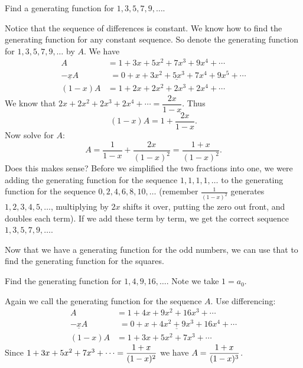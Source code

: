 \documentclass[12pt]{article}
\begin{document}
\begin{example}
 Find a generating function for $1, 3, 5, 7, 9,\ldots$.
 \begin{solution}
  Notice that the sequence of differences is constant. We know how to find the generating function for any constant sequence.  So denote the generating function for $1, 3, 5, 7, 9, \ldots$ by $A$.  We have
  \begin{align*}
   A & = 1 + 3x + 5x^2 + 7x^3 + 9x^4 + \cdots \\
   \underline{-xA} & \underline{\,\,= 0 + x + 3x^2 +  5x^3 + 7x^4 + 9x^5 + \cdots} \\
   (1-x)A & = 1 + 2x + 2x^2 + 2x^3 + 2x^4 + \cdots
  \end{align*}
  We know that $2x + 2x^2 + 2x^3 + 2x^4 + \cdots = \dfrac{2x}{1-x}$.  Thus
  \[(1-x)A = 1 + \frac{2x}{1-x}.\]
  Now solve for $A$:
  \[A = \frac{1}{1-x} + \frac{2x}{(1-x)^2} = \frac{1+x}{(1-x)^2}.\]
  Does this makes sense?  Before we simplified the two fractions into one, we were adding the generating function for the sequence $1,1,1,1,\ldots$ to the generating function for the sequence $0, 2, 4, 6, 8, 10, \ldots$ (remember $\frac{1}{(1-x)^2}$ generates $1,2,3,4,5, \ldots$, multiplying by $2x$ shifts it over, putting the zero out front, and doubles each term).  If we add these term by term, we get the correct sequence $1,3,5,7, 9, \ldots$.
 \end{solution}

\end{example}


Now that we have a generating function for the odd numbers, we can use that to find the generating function for the squares.

\begin{example}
 Find the generating function for $1, 4, 9, 16, \ldots$.  Note we take $1 = a_0$.
 \begin{solution}
  Again we call the generating function for the sequence $A$.  Use differencing:
  \begin{align*}
   A & = 1 + 4x + 9x^2 + 16x^3 + \cdots \\
   \underline{- xA} & \underline{\,\, = 0 + x + 4x^2 + 9x^3 + 16x^4 + \cdots} \\
   (1-x)A & = 1 + 3x + 5x^2 + 7x^3 + \cdots
  \end{align*}
Since $1 + 3x + 5x^2 + 7x^3 + \cdots = \displaystyle\frac{1+x}{(1-x)^2}$ we have $A = \displaystyle\frac{1+x}{(1-x)^3}$.
 \end{solution}
\end{example}
\end{document}
